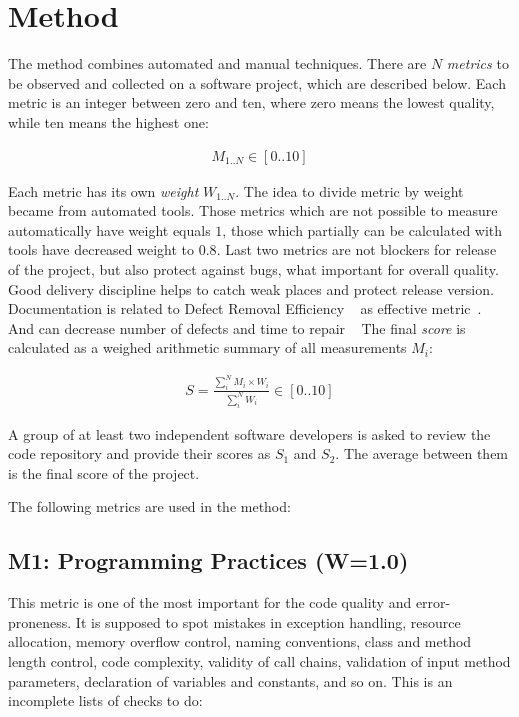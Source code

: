 \documentclass[12pt,oneside]{article}
\begin{document}
\section{Method}
\label{sec:method}

The method combines automated and manual techniques. There are $N$
\emph{metrics} to be observed and collected on a software project, which are described
below. Each metric is an integer between zero and ten, where
zero means the lowest quality, while ten means the highest one:

\begin{eqnarray}
M_{1..N} \in [ 0 .. 10 ]
\end{eqnarray}

Each metric has its own \emph{weight} $W_{1..N}$.
The idea to divide metric by weight became from automated tools. Those metrics which are not possible to measure automatically have weight equals $1$, those which partially can be calculated with tools have decreased weight to $0.8$. Last two metrics are not blockers for release of the project, but also protect against bugs, what important for overall quality. Good delivery discipline helps to catch weak places and protect release version. Documentation is related to Defect Removal Efficiency ~\citep{cj-sqin2012,cj-mess} as effective metric~\citep{marandi2014dre}. And can decrease number of defects and time to repair ~\citep[pp.265--266]{jones2012economics}
The final \emph{score} is calculated
as a weighed arithmetic summary of all measurements $M_i$:

\begin{align}
S = \frac{\sum_i^N M_i \times W_i}{\sum_i^N W_i} \in [0..10]
\end{align}

A group of at least two independent software developers is asked to review the code repository and provide their scores as $S_1$ and $S_2$. The average between them is the final score of the project.

The following metrics are used in the method:

\subsection{M1: Programming Practices (W=1.0)}

This metric is one of the most important for the code quality and error-proneness.
It is supposed to spot mistakes in exception handling, resource allocation, memory overflow control,
naming conventions, class and method length control, code complexity,
validity of call chains, validation of input method parameters,
declaration of variables and constants,
and so on. This is an incomplete lists of checks to do:
\end{document}
